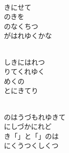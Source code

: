 \documentclass[10pt,b5j]{tarticle} %
\begin{document}
\begin{enumerate}
\begin{minipage}[c]{\blocksize}
    \end{minipage}
    \begin{minipage}[c]{\blocksize}
        
        \vspace{\linespace}
        \item~\\
        きにせて\\
        のきを\\
        のなくちつ\\
        がはれゆくかな
        
    \end{minipage}
    \begin{minipage}[c]{\blocksize}
        
        \vspace{\linespace}
        \item~\\
        しきにはれつ\\
        りてくれゆく\\
        めくの\\
        とにきてり
        
    \end{minipage}
    \begin{minipage}[c]{\blocksize}
        
        \vspace{\linespace}
        \item~\\
        のはうづもれゆきて\\
        にしづかにれど\\
        き「」と「」のは\\
        にくうつくしくつ
    
    \end{minipage}
\end{enumerate} %
\end{document}

